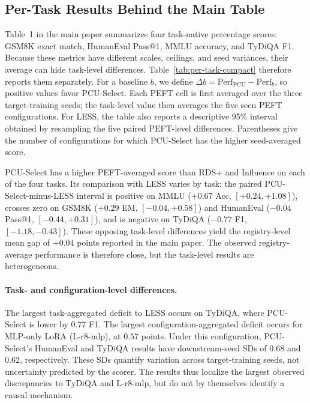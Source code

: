 \subsection{Per-Task Results Behind the Main Table}
\label{sec:appendix-per-task}

Table~1 in the main paper summarizes four task-native percentage scores: GSM8K
exact match, HumanEval Pass@1, MMLU accuracy, and TyDiQA F1. Because these
metrics have different scales, ceilings, and seed variances, their average can
hide task-level differences. Table~\ref{tab:per-task-compact} therefore reports
them separately. For a baseline $b$, we define
$\Delta b=\mathrm{Perf}_{\mathrm{PCU}}-\mathrm{Perf}_{b}$, so positive values
favor PCU-Select. Each PEFT cell is first averaged over the three
target-training seeds; the task-level value then averages the five seen PEFT
configurations. For LESS, the table also reports a descriptive 95\% interval
obtained by resampling the five paired PEFT-level differences. Parentheses give
the number of configurations for which PCU-Select has the higher seed-averaged
score.

PCU-Select has a higher PEFT-averaged score than RDS+ and Influence on each of
the four tasks. Its comparison with LESS varies by task: the paired
PCU-Select-minus-LESS interval is positive on MMLU ($+0.67$ Acc,
$[+0.24,+1.08]$), crosses zero on GSM8K ($+0.29$ EM,
$[-0.04,+0.58]$) and HumanEval ($-0.04$ Pass@1, $[-0.44,+0.31]$), and is
negative on TyDiQA ($-0.77$ F1, $[-1.18,-0.43]$). These opposing task-level
differences yield the registry-level mean gap of $+0.04$ points reported in the
main paper. The observed registry-average performance is therefore close, but
the task-level results are heterogeneous.



\paragraph{Task- and configuration-level differences.}
The largest task-aggregated deficit to LESS occurs on TyDiQA, where PCU-Select
is lower by $0.77$ F1. The largest configuration-aggregated deficit occurs for
MLP-only LoRA (L-r8-mlp), at $0.57$ points. Under this configuration,
PCU-Select's HumanEval and TyDiQA results have downstream-seed SDs of $0.68$
and $0.62$, respectively. These SDs quantify variation across target-training
seeds, not uncertainty predicted by the scorer. The results thus localize the
largest observed discrepancies to TyDiQA and L-r8-mlp, but do not by themselves
identify a causal mechanism.

